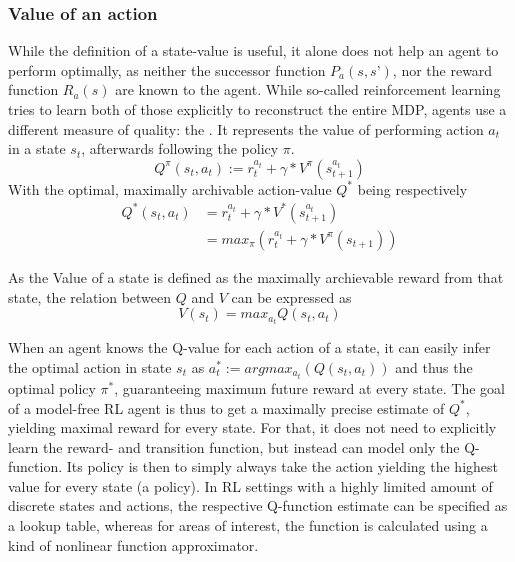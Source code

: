 \subsubsection{Value of an action}
While the definition of a state-value is useful, it alone does not help an agent to perform optimally, as neither the successor function $P_a(s,s’)$, nor the reward function $R_a(s)$ are known to the agent. While so-called  reinforcement learning tries to learn both of those explicitly to reconstruct the entire MDP,  agents use a different measure of quality: the . It represents the value of performing action $a_t$ in a state $s_t$, afterwards following the policy $\pi$.
\begin{equation} \label{eq:1.2}
	Q^\pi(s_t,a_t) := r_t^{a_t} + \gamma * V^\pi(s_{t+1}^{a_t})
\end{equation}
With the optimal, maximally archivable action-value $Q^*$ being respectively
\begin{align}
   Q^*(s_t,a_t) &= r_t^{a_t} + \gamma * V^*(s_{t+1}^{a_t}) \\
	            &= max_\pi ( r_t^{a_t} + \gamma * V^\pi(s_{t+1}))
\end{align}

As the Value of a state is defined as the maximally archievable reward from that state, the relation between $Q$ and $V$ can be expressed as 
\begin{equation} \label{eq:1.25}
	V(s_t) = max_{a_t} Q(s_t, a_t)
\end{equation}

When an agent knows the Q-value for each action of a state, it can easily infer the optimal action in state $s_t$ as $a^*_t := argmax_{a_t}(Q(s_t, a_t))$ and thus the optimal policy $\pi^*$, %
guaranteeing maximum future reward at every state. The goal of a model-free RL agent is thus to get a maximally precise estimate of $Q^*$, yielding maximal reward for every state. For that, it does not need to explicitly learn the reward- and transition function, but instead can model only the Q-function. Its policy is then to simply always take the action yielding the highest value for every state (a  policy).  In RL settings with a highly limited amount of discrete states and actions, the respective Q-function estimate can be specified as a lookup table, whereas for areas of interest, the function is calculated using a kind of nonlinear function approximator. 

